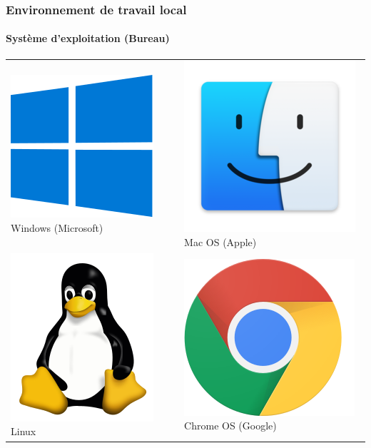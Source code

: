 \documentclass{beamer}
\begin{document}
\begin{frame}
\frametitle{Environnement de travail local}
\framesubtitle{Système d'exploitation (Bureau)}

\begin{tabular}{ll}
	\includegraphics[height=.25\textheight]{..//img/Bweb01-environnement/windows.png} 
	Windows (Microsoft) &
	\includegraphics[height=.25\textheight]{..//img/Bweb01-environnement/mac-finder.png} 
	Mac OS (Apple) \\
	
	\includegraphics[height=.25\textheight]{..//img/Bweb01-environnement/tux.png} 
	Linux &
	\includegraphics[height=.25\textheight]{..//img/Bweb01-environnement/chrome.png} 
	Chrome OS (Google) \\
	

\end{tabular}
\end{frame}
\end{document}
